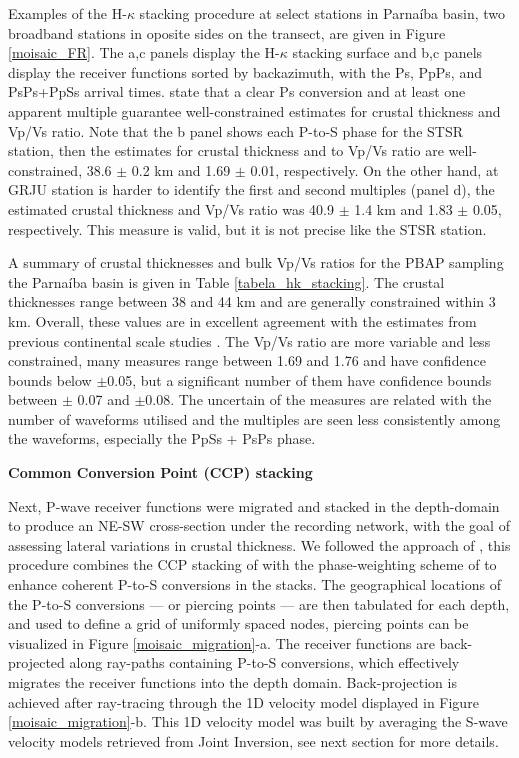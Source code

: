 \documentclass[paper,11pt]{geophysics}
\begin{document}
Examples of the H-$\kappa$ stacking procedure at select stations in Parnaíba basin, two broadband stations in oposite sides on the transect, are given in Figure \ref{moisaic_FR}. The a,c panels display the H-$\kappa$ stacking surface and b,c panels display the receiver functions sorted by backazimuth, with the Ps, PpPs, and PsPs+PpSs arrival times. \cite{zhu_moho_2000} state that a clear Ps conversion and at least one apparent multiple guarantee well-constrained estimates for crustal thickness and Vp/Vs ratio. Note that the b panel shows each P-to-S phase for the STSR station, then the estimates for crustal thickness and to Vp/Vs ratio are well-constrained, 38.6 $\pm$ 0.2 km and 1.69 $\pm$ 0.01, respectively. On the other hand, at GRJU station is harder to identify the first and second multiples (panel d), the estimated crustal thickness and Vp/Vs ratio was 40.9 $\pm$ 1.4 km and 1.83 $\pm$ 0.05, respectively. This measure is valid, but it is not precise like the STSR station.

A summary of crustal thicknesses and bulk Vp/Vs ratios for the PBAP sampling the Parnaíba basin is given in Table \ref{tabela_hk_stacking}. The crustal thicknesses range between 38 and 44 km and are generally constrained within 3 km. Overall, these values are in excellent agreement with the estimates from previous continental scale studies \citep{feng_upper_2007,lloyd_moho_2010,assumpcao_crustal_2013,uieda_fast_2017}. The Vp/Vs ratio are more variable and less constrained, many measures range between 1.69 and 1.76 and have confidence bounds below $\pm $0.05, but a significant number of them have confidence bounds between $\pm $ 0.07 and $\pm $0.08. The uncertain of the measures are related with the number of waveforms utilised and  the multiples are seen less consistently among the waveforms, especially the PpSs + PsPs phase.
\linebreak

\begin{flushleft}
\textbf{Common Conversion Point (CCP) stacking}
\end{flushleft}

Next, P-wave receiver functions were migrated and stacked in the depth-domain to produce an NE-SW cross-section under the recording network, with the goal of assessing lateral variations in crustal thickness. We followed the approach of \cite{frassetto_improved_2010}, this procedure combines the CCP stacking of \cite{gilbert_images_2004} with the phase-weighting scheme of \cite{schimmel_noise_1997} to enhance coherent P-to-S conversions in the stacks.  The geographical locations of  the P-to-S conversions — or piercing points — are then tabulated for each depth, and used to define a grid of uniformly spaced nodes, piercing points can be visualized in Figure \ref{moisaic_migration}-a. The receiver functions are back-projected along ray-paths containing P-to-S conversions, which effectively migrates the receiver functions into the depth domain. Back-projection is achieved after ray-tracing through the 1D velocity model displayed in Figure \ref{moisaic_migration}-b. This 1D velocity model was built by averaging the S-wave velocity models retrieved from Joint Inversion, see next section for more details. 
\end{document}
